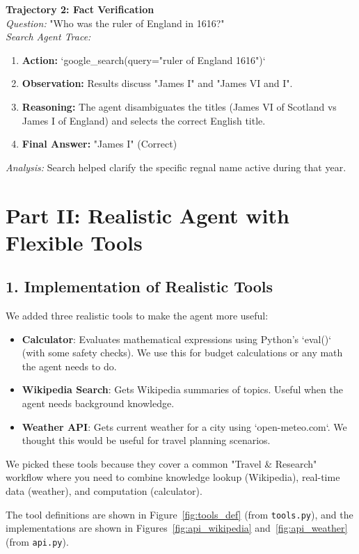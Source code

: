 \documentclass{article}
\begin{document}
\textbf{Trajectory 2: Fact Verification} \\
\textit{Question:} "Who was the ruler of England in 1616?" \\
\textit{Search Agent Trace:}
\begin{enumerate}
    \item \textbf{Action:} `google\_search(query="ruler of England 1616")`
    \item \textbf{Observation:} Results discuss "James I" and "James VI and I".
    \item \textbf{Reasoning:} The agent disambiguates the titles (James VI of Scotland vs James I of England) and selects the correct English title.
    \item \textbf{Final Answer:} "James I" (Correct)
\end{enumerate}
\textit{Analysis:} Search helped clarify the specific regnal name active during that year.

\section{Part II: Realistic Agent with Flexible Tools}

\subsection{1. Implementation of Realistic Tools}

We added three realistic tools to make the agent more useful:
\begin{itemize}
    \item \textbf{Calculator}: Evaluates mathematical expressions using Python's `eval()` (with some safety checks). We use this for budget calculations or any math the agent needs to do.
    \item \textbf{Wikipedia Search}: Gets Wikipedia summaries of topics. Useful when the agent needs background knowledge.
    \item \textbf{Weather API}: Gets current weather for a city using `open-meteo.com`. We thought this would be useful for travel planning scenarios.
\end{itemize}

We picked these tools because they cover a common "Travel \& Research" workflow where you need to combine knowledge lookup (Wikipedia), real-time data (weather), and computation (calculator).

The tool definitions are shown in Figure~\ref{fig:tools_def} (from \texttt{tools.py}), and the implementations are shown in Figures~\ref{fig:api_wikipedia} and~\ref{fig:api_weather} (from \texttt{api.py}).
\end{document}
